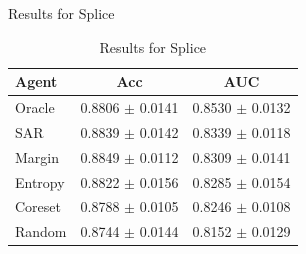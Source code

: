 \documentclass[aspectratio=169, 11pt, invertlogo]{ismll-slides}
\begin{document}

\begin{frame}[fragile]{Results for Splice}
	\begin{table}
		\centering
		\begin{tabular}{l || c | c }
			\textbf{Agent} & \textbf{Acc} & \textbf{AUC} \\
			\hline
			Oracle & 0.8806 $\pm$ 0.0141 & 0.8530 $\pm$ 0.0132 \\
			SAR & 0.8839 $\pm$ 0.0142 & 0.8339 $\pm$ 0.0118 \\
			Margin & 0.8849 $\pm$ 0.0112 & 0.8309 $\pm$ 0.0141 \\
			Entropy & 0.8822 $\pm$ 0.0156 & 0.8285 $\pm$ 0.0154 \\
			Coreset & 0.8788 $\pm$ 0.0105 & 0.8246 $\pm$ 0.0108 \\
			Random & 0.8744 $\pm$ 0.0144 & 0.8152 $\pm$ 0.0129
		\end{tabular}
		\caption*{Results for Splice}
	\end{table}
\end{frame}

\end{document}
